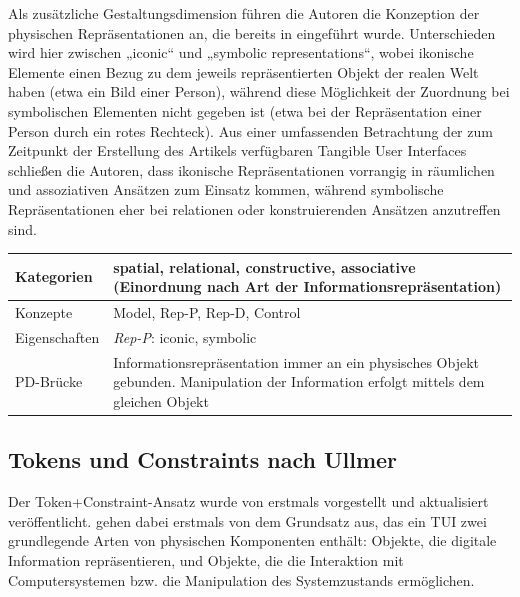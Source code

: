 Als zusätzliche Gestaltungsdimension führen die Autoren die Konzeption der physischen Repräsentationen an, die bereits in \citep{Ullmer97} eingeführt wurde. Unterschieden wird hier zwischen „iconic“ und „symbolic representations“, wobei ikonische Elemente einen Bezug zu dem jeweils repräsentierten Objekt der realen Welt haben (etwa ein Bild einer Person), während diese Möglichkeit der Zuordnung bei symbolischen Elementen nicht gegeben ist (etwa bei der Repräsentation einer Person durch ein rotes Rechteck). Aus einer umfassenden Betrachtung der zum Zeitpunkt der Erstellung des Artikels verfügbaren Tangible User Interfaces schließen die Autoren, dass ikonische Repräsentationen vorrangig in räumlichen und assoziativen Ansätzen zum Einsatz kommen, während symbolische Repräsentationen eher bei relationen oder konstruierenden Ansätzen anzutreffen sind.
\\[1em]
\begin{tabular}{| p{3cm} | p{10cm} |}
  \hline
  Kategorien & spatial, relational, constructive, associative (Einordnung nach Art der Informationsrepräsentation)  \\ \hline
  Konzepte & Model, Rep-P, Rep-D, Control \\ \hline
  Eigenschaften & \emph{Rep-P}: iconic, symbolic \\ \hline
  PD-Brücke & Informationsrepräsentation immer an ein physisches Objekt gebunden. Manipulation der Information erfolgt mittels dem gleichen Objekt \\ \hline
\end{tabular} 


\subsection{Tokens und Constraints nach Ullmer} %
\label{sub:tokens_und_constraints_nach_ullmer}

Der Token+Constraint-Ansatz wurde von \citet{Ullmer02} erstmals vorgestellt und \citet{Ullmer05} aktualisiert veröffentlicht. \citeauthor{Ullmer05} gehen dabei erstmals von dem Grundsatz aus, das ein \gls{TUI} zwei grundlegende Arten von physischen Komponenten enthält: Objekte, die digitale Information repräsentieren, und Objekte, die die Interaktion mit Computersystemen bzw. die Manipulation des Systemzustands ermöglichen.

